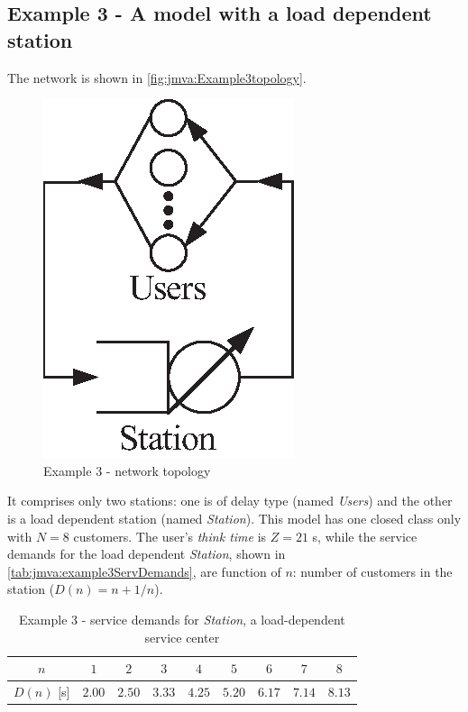 \subsection{Example 3 - A model with a load dependent station}
\label{sec:jmva:example3} The network is shown in
\autoref{fig:jmva:Example3topology}.
\begin{figure}[htbp]
    \begin{center}
        \includegraphics[scale=.65]{img/jmva/example3}
    \end{center}
    \caption{Example 3 - network topology}
    \label{fig:jmva:Example3topology}
\end{figure}
It comprises only two stations: one is of delay type (named
\emph{Users}) and the other is a load dependent station (named
\emph{Station}). This model has one closed class only with $N=8$
customers. The user's \emph{think time} is $Z = 21$ s, while the
service demands for the load dependent \emph{Station}, shown in
\autoref{tab:jmva:example3ServDemands}, are function of $n$: number
of customers in the station ($D(n) = n + 1/n$).

\begin{table}[htbp]
\begin{center}
\begin{tabular}{c|c|c|c|c|c|c|c|c|}
$n$ & $1$ & $2$ & $3$ & $4$ & $5$ & $6$ & $7$ & $8$\\
\hline
$D(n)$ [s] & $2.00$ & $2.50$ & $3.33$ & $4.25$ & $5.20$ & $6.17$ & $7.14$ & $8.13$ \\
\hline
\end{tabular}
\end{center}
\caption{Example 3 - service demands for \emph{Station}, a
load-dependent service center} \label{tab:jmva:example3ServDemands}
\end{table}

